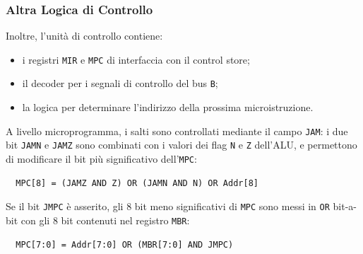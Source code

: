 \documentclass{beamer}
\begin{document}
\begin{frame}[fragile]
  \frametitle{Altra Logica di Controllo}
  Inoltre, l'unità di controllo contiene:
  \begin{itemize}
    \item i registri \lstinline{MIR} e \lstinline{MPC} di interfaccia con il
    control store;
    \item il decoder per i segnali di controllo del bus \lstinline{B};
    \item la logica per determinare l'indirizzo della prossima microistruzione.
  \end{itemize}
  A livello microprogramma, i salti sono controllati mediante il campo
  \lstinline{JAM}: i due bit \lstinline{JAMN} e \lstinline{JAMZ}
  sono combinati con i valori dei flag \lstinline{N} e \lstinline{Z} dell'ALU, e
  permettono di modificare il bit più significativo dell'\lstinline{MPC}:

\begin{lstlisting}
  MPC[8] = (JAMZ AND Z) OR (JAMN AND N) OR Addr[8]
\end{lstlisting}

  Se il bit \lstinline{JMPC} è asserito, gli 8 bit meno significativi di
  \lstinline{MPC} sono messi in \lstinline{OR} bit-a-bit con gli 8 bit contenuti
  nel registro \lstinline{MBR}:

\begin{lstlisting}
  MPC[7:0] = Addr[7:0] OR (MBR[7:0] AND JMPC)
\end{lstlisting}

\end{frame}
\end{document}
